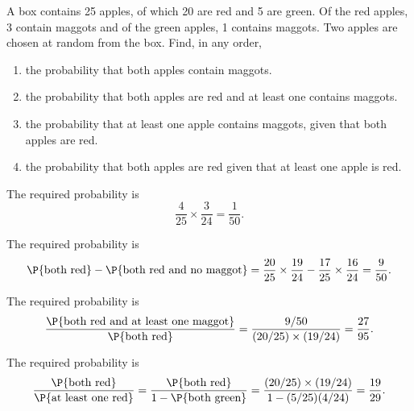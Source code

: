 \begin{problem}
    A box contains 25 apples, of which 20 are red and 5 are green. Of the red apples, 3 contain maggots and of the green apples, 1 contains maggots. Two apples are chosen at random from the box. Find, in any order,
    \begin{enumerate}
        \item the probability that both apples contain maggots.
        \item the probability that both apples are red and at least one contains maggots.
        \item the probability that at least one apple contains maggots, given that both apples are red.
        \item the probability that both apples are red given that at least one apple is red.
    \end{enumerate}
\end{problem}
\begin{solution}
    \begin{ppart}
        The required probability is \[\frac{4}{25} \times \frac{3}{24} = \frac{1}{50}.\]
    \end{ppart}
    \begin{ppart}
        The required probability is \[\P{\text{both red}} - \P{\text{both red and no maggot}} = \frac{20}{25} \times \frac{19}{24} - \frac{17}{25} \times \frac{16}{24} = \frac9{50}.\]
    \end{ppart}
    \begin{ppart}
        The required probability is \[\frac{\P{\text{both red and at least one maggot}}}{\P{\text{both red}}} = \frac{9/50}{(20/25) \times (19/24)} = \frac{27}{95}.\]
    \end{ppart}
    \begin{ppart}
        The required probability is \[\frac{\P{\text{both red}}}{\P{\text{at least one red}}} = \frac{\P{\text{both red}}}{1 - \P{\text{both green}}} = \frac{(20/25) \times (19/24)}{1 - (5/25)(4/24)} = \frac{19}{29}.\]
    \end{ppart}
\end{solution}

